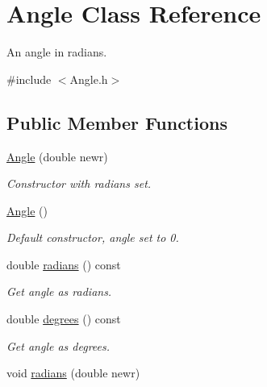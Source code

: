 \hypertarget{class_angle}{\section{Angle Class Reference}
\label{class_angle}
}


An angle in radians.  




{\ttfamily \#include $<$Angle.\+h$>$}

\subsection*{Public Member Functions}
\begin{DoxyCompactItemize}
\item 
\hypertarget{class_angle_abc7ff3241a712b0a5727d7648738ae20}{\hyperlink{class_angle_abc7ff3241a712b0a5727d7648738ae20}{Angle} (double newr)}\label{class_angle_abc7ff3241a712b0a5727d7648738ae20}

\begin{DoxyCompactList}\small\item\em Constructor with radians set. \end{DoxyCompactList}\item 
\hypertarget{class_angle_aca3c6e1519b40835d31736430ca082a9}{\hyperlink{class_angle_aca3c6e1519b40835d31736430ca082a9}{Angle} ()}\label{class_angle_aca3c6e1519b40835d31736430ca082a9}

\begin{DoxyCompactList}\small\item\em Default constructor, angle set to 0. \end{DoxyCompactList}\item 
\hypertarget{class_angle_a81758b7528597b7011730dba27152db4}{double \hyperlink{class_angle_a81758b7528597b7011730dba27152db4}{radians} () const }\label{class_angle_a81758b7528597b7011730dba27152db4}

\begin{DoxyCompactList}\small\item\em Get angle as radians. \end{DoxyCompactList}\item 
\hypertarget{class_angle_aefc1a6f8af03dd64ee7b745a86de3353}{double \hyperlink{class_angle_aefc1a6f8af03dd64ee7b745a86de3353}{degrees} () const }\label{class_angle_aefc1a6f8af03dd64ee7b745a86de3353}

\begin{DoxyCompactList}\small\item\em Get angle as degrees. \end{DoxyCompactList}\item 
\hypertarget{class_angle_a53f6a98f8f29bc7d56cf2aebfac770b4}{void \hyperlink{class_angle_a53f6a98f8f29bc7d56cf2aebfac770b4}{radians} (double newr)}\label{class_angle_a53f6a98f8f29bc7d56cf2aebfac770b4}


\end{DoxyCompactItemize}
